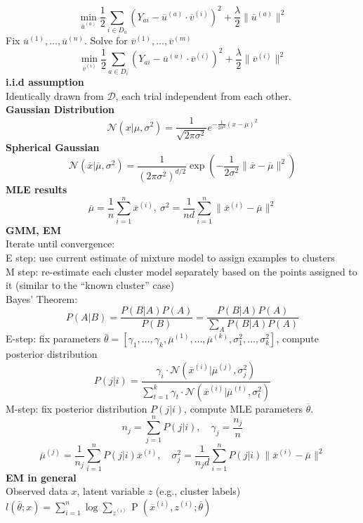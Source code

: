 \documentclass[10pt, letterpaper]{article}
\begin{document}
\begin{multicols*}{2}
\[\min_{\overline{u}^{(a)}}\frac 12 \sum_{i\in D_a} (Y_{ai} - \overline{u}^{(a)}\cdot \overline{v}^{(i)})^2 + \frac{\lambda}{2} \|\overline{u}^{(a)}\|^2\]
Fix $\overline{u}^{(1)},\dots,\overline{u}^{(n)}$. Solve for $\overline{v}^{(1)},\dots,\overline{v}^{(m)}$
\[\min_{\overline{v}^{(i)}}\frac 12 \sum_{a\in D_i} (Y_{ai} - \overline{u}^{(a)}\cdot \overline{v}^{(i)})^2 + \frac{\lambda}{2} \|\overline{v}^{(i)}\|^2\]
\textbf{i.i.d assumption}\\
Identically drawn from $\mathcal{D}$, each trial independent from each other.\\
\textbf{Gaussian Distribution}
\[\mathcal{N}\left(x | \mu, \sigma^{2}\right)=\frac{1}{\sqrt{2 \pi \sigma^{2}}} e^{-\frac{1}{2 \sigma^{2}}(x-\mu)^{2}}\]
\textbf{Spherical Gaussian}
\[\mathcal{N}\left(\overline{x} | \overline{\mu}, \sigma^{2}\right)=\frac{1}{(2\pi\sigma^2)^{d/2}}\exp\left(-\frac{1}{2\sigma^2}\|\overline x - \overline \mu\|^2\right) \]
\textbf{MLE results}\\
\[\overline \mu = \frac 1 n \sum_{i = 1}^n \overline{x}^{(i)}, ~\sigma^2 = \frac1{nd}\sum_{i = 1}^n \|\overline{x}^{(i)} - \overline \mu\|^2\]
\textbf{GMM, EM}\\
Iterate until convergence:\\
E step: use current estimate of mixture model to
assign examples to clusters\\
M step: re-estimate each cluster model separately
based on the points assigned to it (similar to the
``known cluster'' case)\\
Bayes' Theorem:
\[P(A|B)=\frac{P(B|A)P(A)}{P(B)} = \frac{P(B|A)P(A)}{\sum_{A} P(B|A)P(A)}\]
E-step: fix parameters $\overline{\theta} = [\gamma_1,\dots,\gamma_k, \overline{\mu}^{(1)}, \dots, \overline{\mu}^{(k)},\sigma_1^2,\dots,\sigma_k^2]$, compute posterior distribution
\[P(j|i) = \frac{\gamma_i\cdot\mathcal{N}(\overline{x}^{(i)}|\overline{\mu}^{(j)}, \sigma_j^2)}{\sum_{t = 1}^k \gamma_t\cdot\mathcal{N}(\overline{x}^{(i)}|\overline{\mu}^{(t)}, \sigma_t^2)}\]
M-step: fix posterior distribution $P(j|i)$, compute MLE parameters $\overline{\theta}$.
\[n_j = \sum_{j=1}^n P(j|i),\quad\gamma_j = \frac{n_j}{n}\]
\[\overline \mu^{(j)} = \frac 1 {n_j} \sum_{i = 1}^n P(j|i) \overline{x}^{(i)},\quad\sigma_j^2 = \frac1{n_j d}\sum_{i = 1}^n P(j|i) \|\overline{x}^{(i)} - \overline \mu\|^2\]
\textbf{EM in general}\\
Observed data $x$, latent variable $z$ (e.g., cluster labels)\\
$l(\overline{\theta};x) = \sum_{i=1}^n\log \sum_{z^{(i)}} \operatorname{P}(\overline{x}^{(i)},z^{(i)};\overline{\theta})$\\

\end{multicols*}
\end{document}
